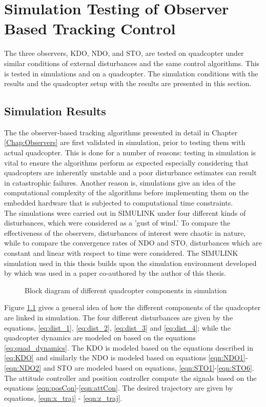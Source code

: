 \documentclass[letterpaper%
, twoside%
, 12pt%
,memoire%
, english%
,creativecommons,hyperref%
]{thETS}
\begin{document}
\chapter{Simulation Testing of Observer Based Tracking Control} \label{Chap:ResultsSim}
The three observers, KDO, NDO, and STO, are tested on quadcopter under similar conditions of external disturbances and the same control algorithms. This is tested in simulations and on a quadcopter. The simulation conditions with the results and the quadcopter setup with the results are presented in this section. 

\section{Simulation Results} \label{section:SimulationResults}
The the observer-based tracking algorithms presented in detail in Chapter \ref{Chap:Observers} are first validated in simulation, prior to testing them with actual quadcopter. This is done for a number of reasons: testing in simulation is vital to ensure the algorithms perform as expected especially considering that quadcopters are inherently unstable and a poor disturbance estimates can result in catastrophic failures. Another reason is, simulations give an idea of the computational complexity of the algorithms before implementing them on the embedded hardware that is subjected to computational time constraints. \\
The simulations were carried out in SIMULINK under four different kinds of disturbances, which were considered as a 'gust of wind.' To compare the effectiveness of the observers, disturbances of interest were chaotic in nature, while to compare the convergence rates of NDO and STO, disturbances which are constant and linear with respect to time were considered. 
The SIMULINK simulation used in this thesis builds upon the simulation environment developed by \citep{nuradeen2019thesis} which was used in a paper co-authored by the author of this thesis. 
\begin{figure}
	\centerline{}
	\caption{Block diagram of different quadcopter components in simulation}	
	\label{block_simulation}
\end{figure}
Figure \ref{block_simulation} gives a general idea of how the different components of the quadcopter are linked in simulation. The four different disturbances are given by the equations, \eqref{eq:dist_1}, \eqref{eq:dist_2}, \eqref{eq:dist_3} and \eqref{eq:dist_4}; while the quadcopter dynamics are modeled on based on the equations \eqref{eq:quad_dynamics}. The KDO is modeled based on the equations described in \eqref{eq:KDO} and similarly the NDO is modeled based on equations \eqref{eqn:NDO1}-\eqref{eqn:NDO2} and STO are modeled based on equations, \eqref{eqn:STO1}-\eqref{eqn:STO6}. The attitude controller and position controller compute the signals based on the equations \eqref{eqn:posCon}-\eqref{eqn:attCon}. The desired trajectory are given by equations, \eqref{eqn:x_traj} - \eqref{eqn:z_traj}. 
\end{document}
